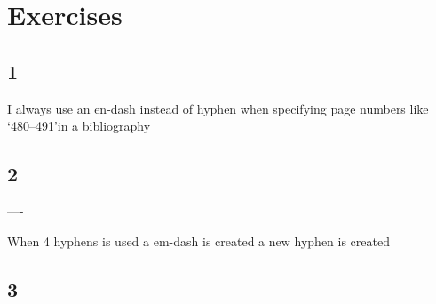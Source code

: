 \documentclass[10pt]{article}
\begin{document}
\section{Exercises}

\subsection*{1}

I always use an en-dash instead of hyphen when specifying page numbers like \lq 480--491\rq in a bibliography

\subsection*{2}

----

When 4 hyphens is used a em-dash is created a new hyphen is created

\subsection*{3}
\end{document}
